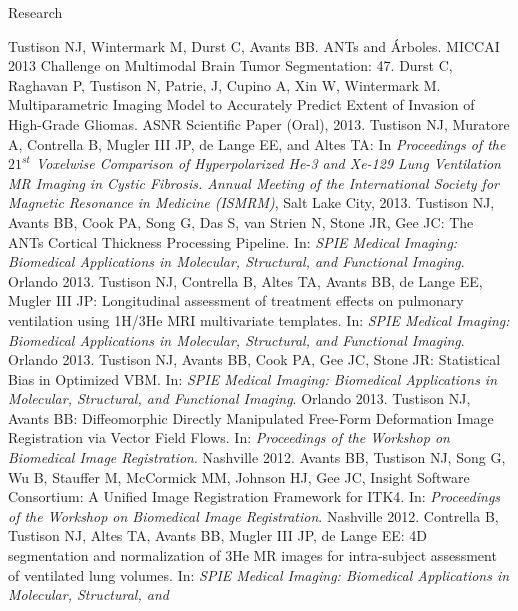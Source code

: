 \documentclass{resume}
\begin{document}
\begin{category}{Research}

   \begin{itemize}
   \citemnobullet Tustison NJ, Wintermark M, Durst C, Avants BB. ANTs and \'{A}rboles. MICCAI 2013 Challenge on Multimodal Brain Tumor Segmentation: 47.
   \citemnobullet Durst C, Raghavan P, Tustison N, Patrie, J, Cupino A, Xin W, Wintermark M. Multiparametric Imaging Model to Accurately Predict Extent of Invasion of High-Grade Gliomas. ASNR Scientific Paper (Oral), 2013.
   \citemnobullet Tustison NJ, Muratore A, Contrella B, Mugler III JP, de Lange EE, and Altes TA:  
   In {\em Proceedings of the $21^{st}$ Voxelwise Comparison of Hyperpolarized He-3 and Xe-129 Lung Ventilation MR Imaging in Cystic Fibrosis.  Annual Meeting of the International Society for Magnetic Resonance in Medicine (ISMRM)}, Salt Lake City, 2013.
   \citemnobullet Tustison NJ, Avants BB, Cook PA, Song G, Das S, van Strien N, Stone JR,
   Gee JC:  The ANTs Cortical Thickness Processing Pipeline.  
   In: {\em SPIE Medical Imaging: Biomedical Applications in Molecular, Structural, and 
   Functional Imaging}. Orlando 2013.
   \citemnobullet Tustison NJ, Contrella B, Altes TA, Avants BB, de Lange EE, Mugler III JP:  
   Longitudinal assessment of treatment effects on pulmonary ventilation using 1H/3He MRI 
   multivariate templates.
   In: {\em SPIE Medical Imaging: Biomedical Applications in Molecular, Structural, and 
   Functional Imaging}. Orlando 2013.
   \citemnobullet Tustison NJ, Avants BB, Cook PA, Gee JC, Stone JR:  
   Statistical Bias in Optimized VBM.
   In: {\em SPIE Medical Imaging: Biomedical Applications in Molecular, Structural, and 
   Functional Imaging}. Orlando 2013.
   \citemnobullet Tustison NJ, Avants BB:  Diffeomorphic Directly Manipulated Free-Form Deformation Image   
   Registration via Vector Field Flows.  In:  {\em Proceedings of the Workshop on Biomedical Image 
   Registration}.  Nashville 2012.
   \citemnobullet Avants BB, Tustison NJ, Song G, Wu B, Stauffer M, McCormick MM, Johnson HJ, Gee JC, Insight Software Consortium:  A Unified Image Registration Framework 
   for ITK4.  In:  {\em Proceedings of the Workshop on Biomedical Image 
   Registration}.  Nashville 2012.
   \citemnobullet Contrella B, Tustison NJ, Altes TA, Avants BB, Mugler III JP, de Lange EE: 
   4D segmentation and normalization of 3He MR images for intra-subject assessment of ventilated lung
   volumes. In: {\em SPIE Medical Imaging: Biomedical Applications in Molecular, Structural, and 
}
\end{itemize}
\end{category}
\end{document}
